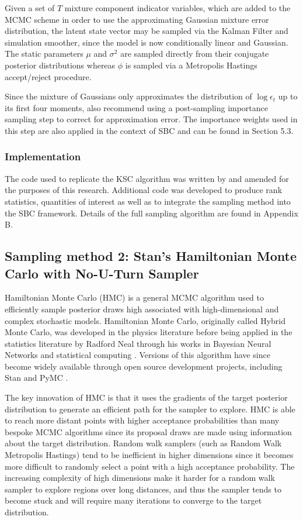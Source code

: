 \documentclass[12pt, a4paper]{article}
\begin{document}
        Given a set of $T$ mixture component indicator variables, which are added to the MCMC scheme in order to use the approximating Gaussian mixture error distribution, the latent state vector may be sampled via the Kalman Filter and simulation smoother, since the model is now conditionally linear and Gaussian. The static parameters $\mu$ and $\sigma^2$ are sampled directly from their conjugate posterior distributions whereas $\phi$ is sampled via a Metropolis Hastings accept/reject procedure.

        Since the mixture of Gaussians only approximates the distribution of $\log \epsilon_t$ up to its first four moments, \citet{kim1998stochastic} also recommend using a post-sampling importance sampling step to correct for approximation error. The importance weights used in this step are also applied in the context of SBC and can be found in Section 5.3. 
        
        \subsubsection*{Implementation}
        The code used to replicate the KSC algorithm was written by \citet{chad2018} and amended for the purposes of this research. Additional code was developed to produce rank statistics, quantities of interest as well as to integrate the sampling method into the SBC framework. Details of the full sampling algorithm are found in Appendix B. 

        
    \subsection{Sampling method 2: Stan's Hamiltonian Monte Carlo with No-U-Turn Sampler}
        Hamiltonian Monte Carlo (HMC) is a  general MCMC algorithm used to efficiently sample posterior draws  high associated with high-dimensional and complex stochastic models. Hamiltonian Monte Carlo, originally called Hybrid Monte Carlo, was developed in the physics literature \citep{duane1987hybrid} before being applied in the statistics literature by Radford Neal through his works in Bayesian Neural Networks \citep{neal1995bayesian} and statistical computing \citep{neal2011mcmc}. Versions of this algorithm have since become widely available through open source development projects, including Stan \citep{stan} and PyMC \citep{pymc2023}.

        The key innovation of HMC is that it uses the gradients of the target posterior distribution to generate an efficient path for the sampler to explore. HMC is able to reach more distant points with higher acceptance probabilities than many bespoke MCMC algorithms since its  proposal draws are made using information about the target distribution. Random walk samplers (such as Random Walk Metropolis Hastings) tend to be inefficient in higher dimensions since it becomes more difficult to randomly select a point with a high acceptance probability. The increasing complexity of high dimensions make it harder for a random walk sampler to explore regions over long distances, and thus the sampler tends to become stuck and will require many iterations to converge to the target distribution. 
\end{document}
